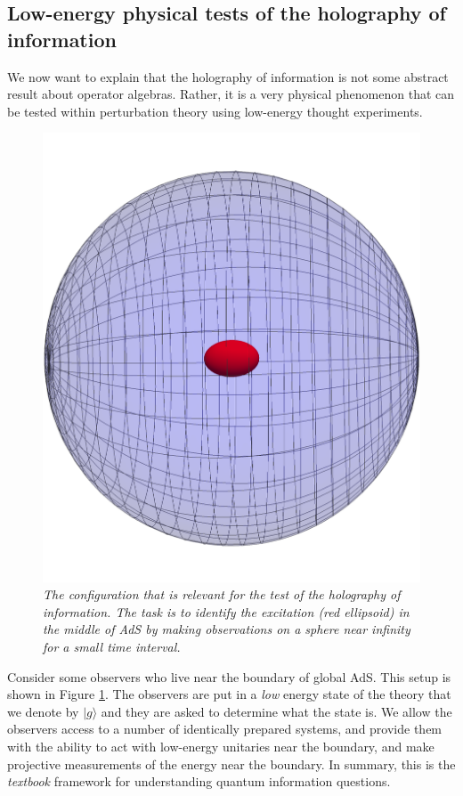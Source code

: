 \documentclass[12pt]{article}
\begin{document}
\subsection{Low-energy physical tests of the holography of information \label{lowenergy}}
We now want to explain that the holography of information is not some abstract result about operator algebras. Rather, it is a very physical phenomenon that can be tested within perturbation theory using low-energy thought experiments.

\begin{figure}[!ht]
\begin{center}
\includegraphics[height=0.5\textheight]{detectorconfiguration.pdf}
\caption{\em The configuration that is relevant for the test of the holography of information. The task is to identify the excitation (red ellipsoid) in the middle of AdS by making observations on a sphere near infinity for a small time interval. \label{figdetectors}}
\end{center}
\end{figure}
Consider some observers who live near the boundary of global AdS. This setup is shown in Figure \ref{figdetectors}. The observers are put in a {\em low} energy state of the theory that we denote by $| g \rangle$  and they are  asked to determine what the state is. We allow the observers access to a number of identically prepared systems, and provide them with the ability to act with low-energy unitaries near the boundary, and make projective measurements of the energy near the boundary. In summary, this is the {\em textbook} framework for understanding quantum information questions.
\end{document}

